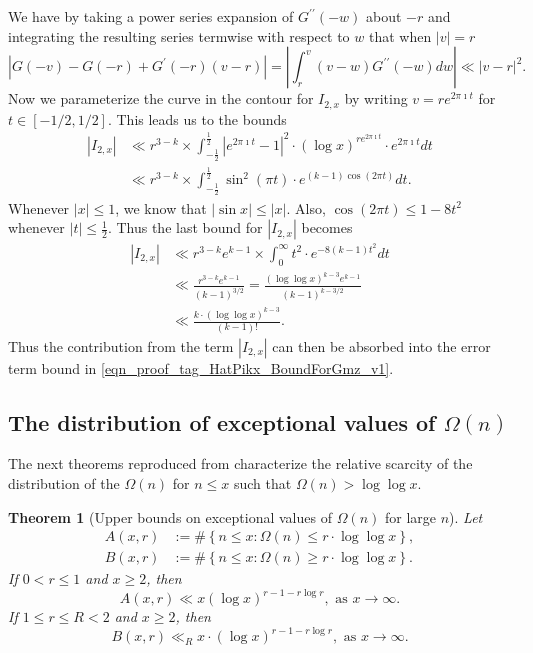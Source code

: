\documentclass[11pt,reqno,a4letter]{article}
\numberwithin{figure}{section}
\numberwithin{table}{section}
\theoremstyle{plain}
\newtheorem{theorem}{Theorem}
\numberwithin{theorem}{section}
\theoremstyle{definition}
\begin{document}
We have by taking a power series expansion of $G^{\prime\prime}(-w)$ about $-r$ and integrating 
the resulting series termwise with respect to $w$ that when $|v| = r$ 
\[
\left\lvert G(-v) - G(-r) + G^{\prime}(-r) (v-r) \right\rvert = 
     \left\lvert \int_{r}^{v} (v-w) G^{\prime\prime}(-w) dw \right\rvert \ll |v-r|^2. 
\] 
Now we parameterize the curve in the contour for $I_{2,x}$ by writing 
$v = re^{2\pi\imath t}$ for $t \in [-1/2, 1/2]$. This leads us to the bounds 
\begin{align*} 
|I_{2,x}| & \ll r^{3-k} \times \int_{-\frac{1}{2}}^{\frac{1}{2}} |e^{2\pi\imath t} - 1|^2 \cdot 
     (\log x)^{r e^{2\pi\imath t}} \cdot e^{2\pi\imath t} dt \\ 
     & \ll r^{3-k} \times \int_{-\frac{1}{2}}^{\frac{1}{2}} \sin^2(\pi t) \cdot 
     e^{(k-1) \cos(2\pi t)} dt. 
\end{align*} 
Whenever $|x| \leq 1$, we know that $|\sin x| \leq |x|$. 
Also, $\cos(2\pi t) \leq 1 - 8t^2$ whenever $|t| \leq \frac{1}{2}$. 
Thus the last bound for $|I_{2,x}|$ becomes 
\begin{align*} 
|I_{2,x}| & \ll r^{3-k} e^{k-1} \times \int_0^{\infty} t^2 \cdot e^{-8(k-1)t^2} dt \\ 
     & \ll \frac{r^{3-k} e^{k-1}}{(k-1)^{3/2}} = \frac{(\log\log x)^{k-3} e^{k-1}}{(k-1)^{k-3/2}} \\ 
     & \ll \frac{k \cdot (\log\log x)^{k-3}}{(k-1)!}. 
\end{align*} 
Thus the contribution from the term $|I_{2,x}|$ can then be absorbed into the error term bound 
in \eqref{eqn_proof_tag_HatPikx_BoundForGmz_v1}. 

\subsection{The distribution of exceptional values of $\Omega(n)$} 

The next theorems reproduced from \cite[\S 7.4]{MV} characterize the relative 
scarcity of the distribution of the $\Omega(n)$ for $n \leq x$ such that 
$\Omega(n) > \log\log x$. 

\begin{theorem}[Upper bounds on exceptional values of $\Omega(n)$ for large $n$] 
\label{theorem_MV_Thm7.20-init_stmt} 
Let 
\begin{align*} 
A(x, r) & := \#\left\{n \leq x: \Omega(n) \leq r \cdot \log\log x\right\}, \\ 
B(x, r) & := \#\left\{n \leq x: \Omega(n) \geq r \cdot \log\log x\right\}. 
\end{align*} 
If $0 < r \leq 1$ and $x \geq 2$, then 
\[
A(x, r) \ll x (\log x)^{r-1 - r\log r}, \text{ \ as\ } x \rightarrow \infty. 
\]
If $1 \leq r \leq R < 2$ and $x \geq 2$, then 
\[
B(x, r) \ll_R x \cdot (\log x)^{r-1-r \log r}, \text{ \ as\ } x \rightarrow \infty. 
\]
\end{theorem} 
\end{document}
